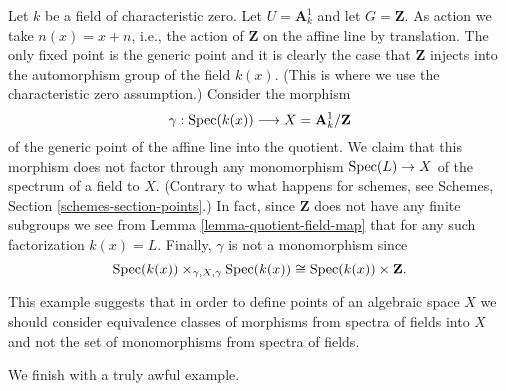 \begin{example}
\label{example-affine-line-translation}
Let $k$ be a field of characteristic zero.
Let $U = \mathbf{A}^1_k$ and let $G = \mathbf{Z}$.
As action we take $n(x) = x + n$, i.e., the action of
$\mathbf{Z}$ on the affine line by translation.
The only fixed point is the generic point and it
is clearly the case that $\mathbf{Z}$ injects into
the automorphism group of the field $k(x)$. (This is
where we use the characteristic zero assumption.)
Consider the morphism
$$
\gamma : \mathop{\rm Spec}(k(x)) \longrightarrow X = \mathbf{A}^1_k/\mathbf{Z}
$$
of the generic point of the affine line into the quotient.
We claim that this morphism does not factor through any
monomorphism $\mathop{\rm Spec}(L) \to X$ of the spectrum of
a field to $X$. (Contrary to what happens for schemes, see
Schemes, Section \ref{schemes-section-points}.) In fact, since
$\mathbf{Z}$ does not have any finite subgroups we see from
Lemma \ref{lemma-quotient-field-map} that for any such
factorization $k(x) = L$. Finally, $\gamma$ is not a monomorphism
since
$$
\mathop{\rm Spec}(k(x)) \times_{\gamma, X, \gamma} \mathop{\rm Spec}(k(x))
\cong
\mathop{\rm Spec}(k(x)) \times \mathbf{Z}.
$$
\end{example}

\noindent
This example suggests that in order to define points of an algebraic space
$X$ we should consider equivalence classes of morphisms from spectra
of fields into $X$ and not the set of monomorphisms from spectra of fields.

\medskip\noindent
We finish with a truly awful example.

